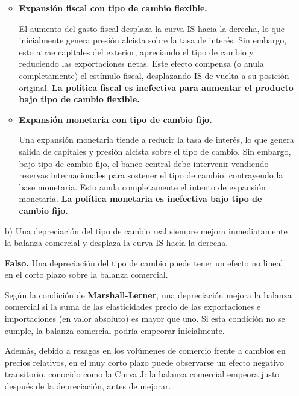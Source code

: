 \documentclass[a4paper]{article}
\begin{document}
\begin{enumerate}
\begin{solution}
\begin{itemize}
        \item \textbf{Expansión fiscal con tipo de cambio flexible.}

        El aumento del gasto fiscal desplaza la curva IS hacia la derecha, lo que inicialmente genera presión alcista sobre la tasa de interés. Sin embargo, esto atrae capitales del exterior, apreciando el tipo de cambio y reduciendo las exportaciones netas. Este efecto compensa (o anula completamente) el estímulo fiscal, desplazando IS de vuelta a su posición original. \textbf{La política fiscal es inefectiva para aumentar el producto bajo tipo de cambio flexible.}

        \item \textbf{Expansión monetaria con tipo de cambio fijo.}

        Una expansión monetaria tiende a reducir la tasa de interés, lo que genera salida de capitales y presión alcista sobre el tipo de cambio. Sin embargo, bajo tipo de cambio fijo, el banco central debe intervenir vendiendo reservas internacionales para sostener el tipo de cambio, contrayendo la base monetaria. Esto anula completamente el intento de expansión monetaria. \textbf{La política monetaria es inefectiva bajo tipo de cambio fijo.}

    \end{itemize}
    \end{solution}

    \item[b)] Una depreciación del tipo de cambio real siempre mejora inmediatamente la balanza comercial y desplaza la curva IS hacia la derecha.
    \begin{solution}
    \textbf{Falso.} Una depreciación del tipo de cambio puede tener un efecto no lineal en el corto plazo sobre la balanza comercial.

    \medskip

    Según la condición de \textbf{Marshall-Lerner}, una depreciación mejora la balanza comercial si la suma de las elasticidades precio de las exportaciones e importaciones (en valor absoluto) es mayor que uno. Si esta condición no se cumple, la balanza comercial podría empeorar inicialmente.

    \medskip

    Además, debido a rezagos en los volúmenes de comercio frente a cambios en precios relativos, en el muy corto plazo puede observarse un efecto negativo transitorio, conocido como la Curva J: la balanza comercial empeora justo después de la depreciación, antes de mejorar.


\end{solution}
\end{enumerate}
\end{document}
